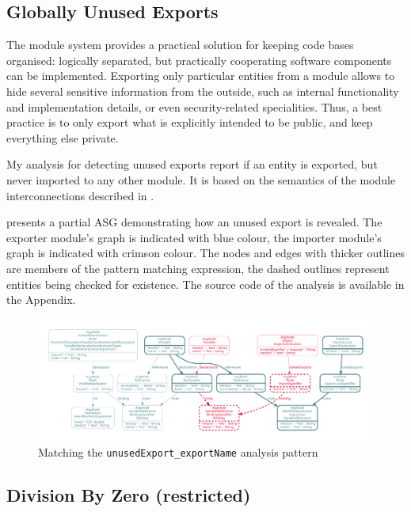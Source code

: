 \subsection{Globally Unused Exports}

The \es module system provides a practical solution for keeping code bases organised: logically separated, but practically cooperating software components can be implemented. Exporting only particular entities from a module allows to hide several sensitive information from the outside, such as internal functionality and implementation details, or even security-related specialities. Thus, a best practice is to only export what is explicitly intended to be public, and keep everything else private.

My analysis for detecting unused exports report if an entity is exported, but never imported to any other module. It is based on the semantics of the module interconnections described in .

 presents a partial ASG demonstrating how an unused export is revealed. The exporter module's graph is indicated with blue colour, the importer module's graph is indicated with crimson colour. The nodes and edges with thicker outlines are members of the pattern matching expression, the dashed outlines represent entities being checked for existence. The source code of the analysis is available in the Appendix.

\vspace*{1mm}
\begin{figure}[!htb]
	\centering
	\includegraphics[width=\textwidth, trim=12mm 12mm 12mm 12mm,clip]{figures/analysis_exportName.pdf}
	\caption{Matching the \lstinline{unusedExport_exportName} analysis pattern}
	\label{fig:analysis-unusedexport}
\end{figure}


\subsection{Division By Zero (restricted)}

